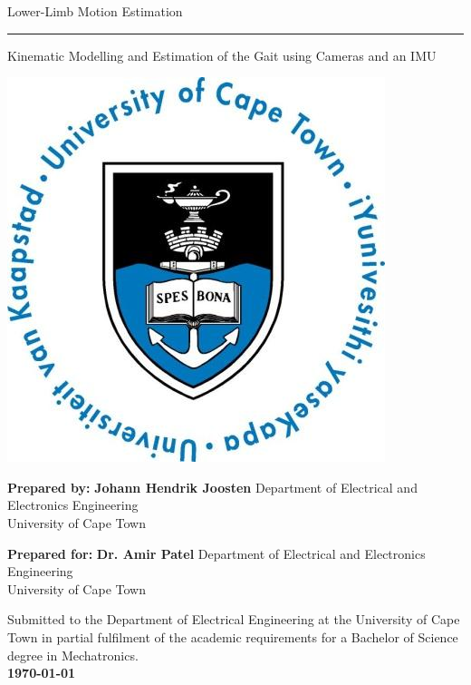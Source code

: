 \thispagestyle{empty}
{\Huge \begin{center}

Lower-Limb Motion Estimation 
\vskip 3mm
\hrule 

\vskip 3mm
{\Large Kinematic Modelling and Estimation of the Gait using Cameras and an IMU}
\end{center}}

\vskip 3mm
\begin{center}
\includegraphics[scale = 0.35]{figures/uctLogo.png}
\end{center}

\vskip 3mm
\begin{center}
{\large
\textbf{Prepared by:}
\vskip 0.01mm
\textbf{\LARGE Johann Hendrik Joosten}
\vskip 0mm
Department of Electrical and Electronics Engineering\\University of Cape Town
}
\end{center}

\vskip 3mm
\begin{center}
{\large
\textbf{Prepared for:}
\vskip 0.01mm
\textbf{\LARGE Dr. Amir Patel}
\vskip 0mm
Department of Electrical and Electronics Engineering\\University of Cape Town
}
\end{center}


\vskip 5mm
\begin{center}
Submitted to the Department of Electrical Engineering at the University of Cape Town in partial
fulfilment of the academic requirements for a Bachelor of Science degree in Mechatronics.\\
{\bf \today}
\end{center}


